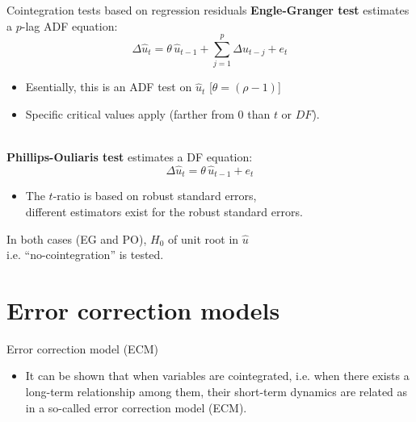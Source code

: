 \documentclass{beamer}
\begin{document}
\begin{frame}{Cointegration tests based on regression residuals}
\textbf{Engle-Granger test} estimates a $p$-lag ADF equation:\\
$$
\Delta \hat{u}_t = \theta \, \hat{u}_{t-1} +
\sum_{j=1}^p \Delta \hat{u}_{t-j} + e_t
$$
\begin{itemize}
    \item Esentially, this is an ADF test on $\hat{u}_t$ [$\theta = (\rho -1)$]
    \item Specific critical values apply (farther from 0 than $t$ or $DF$).\\~\\
\end{itemize}

\textbf{Phillips-Ouliaris test} estimates a DF equation:\\
\vspace{-0.3cm}
$$\Delta \hat{u}_t = \theta \, \hat{u}_{t-1} + e_t$$
\vspace{-0.5cm}
\begin{itemize}
    \item The $t$-ratio is based on robust standard errors,\\different estimators exist for the robust standard errors.
\end{itemize}
\medskip
In both cases (EG and PO), $H_0$ of unit root in $\hat{u}$ \\i.e. ``no-cointegration'' is tested.
\end{frame}


\section{Error correction models}
\begin{frame}{Error correction model (ECM)}
\begin{itemize}
\item It can be shown that when variables are cointegrated, i.e. when there exists a long-term relationship among them, their short-term dynamics are related as in a so-called error correction model (ECM).
\end{itemize}
\end{frame}

\end{document}
